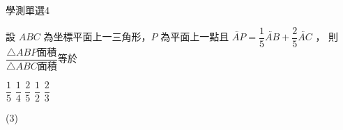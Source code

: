     \begin{QUESTION}
        \begin{ExamInfo}{92}{學測}{單選}{4}
        \end{ExamInfo}
        \begin{ExamAnsRateInfo}{49}{69}{47}{31}
        \end{ExamAnsRateInfo}
        \begin{QBODY}
            設 $ABC$ 為坐標平面上一三角形，$P$ 為平面上一點且 $\lvec{AP} = \dfrac{1}{5} \lvec{AB} + \dfrac{2}{5} \lvec{AC}$ ， 則 $\dfrac{\triangle ABP \mbox{面積}}{ \triangle ABC \mbox{面積}}$等於 
            \begin{QOPS}
                \QOP $\dfrac{1}{5}$ 
                \QOP $\dfrac{1}{4}$ 
                \QOP $\dfrac{2}{5}$ 
                \QOP $\dfrac{1}{2}$         
                \QOP $\dfrac{2}{3}$
            \end{QOPS}
        \end{QBODY}
        \begin{QFROMS}
        \end{QFROMS}
        \begin{QTAGS}\end{QTAGS}
        \begin{QANS}
            (3)
        \end{QANS}
        \begin{QSOLLIST}
        \end{QSOLLIST}
        \begin{QEMPTYSPACE}
        \end{QEMPTYSPACE}
    \end{QUESTION}
